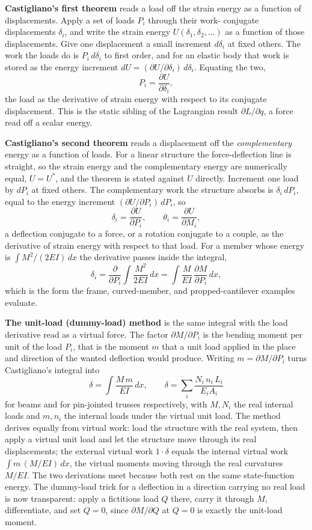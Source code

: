 \textbf{Castigliano's first theorem} reads a load off the strain energy as a
function of displacements. Apply a set of loads $P_i$ through their work-
conjugate displacements $\delta_i$, and write the strain energy
$U(\delta_1,\delta_2,\ldots)$ as a function of those displacements. Give one
displacement a small increment $d\delta_i$ at fixed others. The work the
loads do is $P_i\,d\delta_i$ to first order, and for an elastic body that work
is stored as the energy increment $dU = (\partial U/\partial\delta_i)\,
d\delta_i$. Equating the two,
\[
P_i = \frac{\partial U}{\partial\delta_i},
\]
the load as the derivative of strain energy with respect to its conjugate
displacement. This is the static sibling of the Lagrangian result
$\partial L/\partial q$, a force read off a scalar energy.

\textbf{Castigliano's second theorem} reads a displacement off the
\emph{complementary} energy as a function of loads. For a linear structure
the force-deflection line is straight, so the strain energy and the
complementary energy are numerically equal, $U = U^*$, and the theorem is
stated against $U$ directly. Increment one load by $dP_i$ at fixed others.
The complementary work the structure absorbs is $\delta_i\,dP_i$, equal to
the energy increment $(\partial U/\partial P_i)\,dP_i$, so
\[
\delta_i = \frac{\partial U}{\partial P_i},
\qquad
\theta_i = \frac{\partial U}{\partial M_i},
\]
a deflection conjugate to a force, or a rotation conjugate to a couple, as
the derivative of strain energy with respect to that load. For a member whose
energy is $\int M^2/(2EI)\,dx$ the derivative passes inside the integral,
\[
\delta_i = \frac{\partial}{\partial P_i}\int \frac{M^2}{2EI}\,dx
= \int \frac{M}{EI}\,\frac{\partial M}{\partial P_i}\,dx,
\]
which is the form the frame, curved-member, and propped-cantilever examples
evaluate.

\textbf{The unit-load (dummy-load) method} is the same integral with the
load derivative read as a virtual force. The factor $\partial M/\partial P_i$
is the bending moment per unit of the load $P_i$, that is the moment $m$ that
a unit load applied in the place and direction of the wanted deflection would
produce. Writing $m = \partial M/\partial P_i$ turns Castigliano's integral
into
\[
\delta = \int \frac{M\,m}{EI}\,dx,
\qquad
\delta = \sum_i \frac{N_i\,n_i\,L_i}{E_i A_i}
\]
for beams and for pin-jointed trusses respectively, with $M,N_i$ the real
internal loads and $m,n_i$ the internal loads under the virtual unit load.
The method derives equally from virtual work: load the structure with the
real system, then apply a virtual unit load and let the structure move
through its real displacements; the external virtual work $1\cdot\delta$
equals the internal virtual work $\int m\,(M/EI)\,dx$, the virtual moments
moving through the real curvatures $M/EI$. The two derivations meet because
both rest on the same state-function energy. The dummy-load trick for a
deflection in a direction carrying no real load is now transparent: apply a
fictitious load $Q$ there, carry it through $M$, differentiate, and set
$Q=0$, since $\partial M/\partial Q$ at $Q=0$ is exactly the unit-load
moment.


